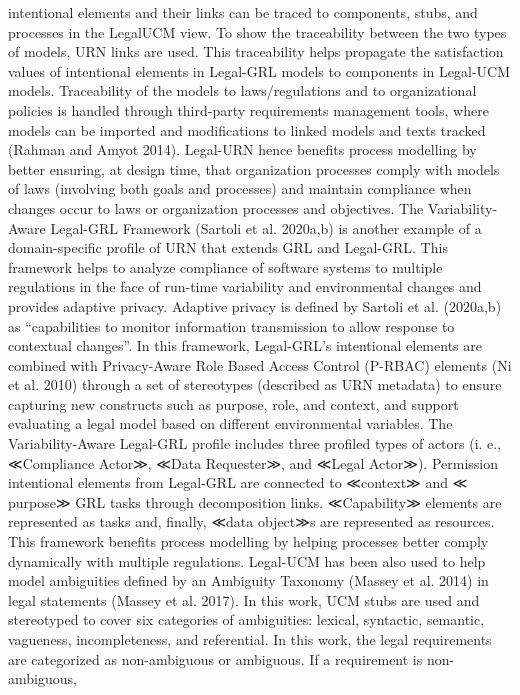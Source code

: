 intentional elements and their links can be traced
to components, stubs, and processes in the LegalUCM view. To show the traceability between the
two types of models, URN links are used. This
traceability helps propagate the satisfaction values
of intentional elements in Legal-GRL models to
components in Legal-UCM models. Traceability
of the models to laws/regulations and to organizational policies is handled through third-party
requirements management tools, where models
can be imported and modifications to linked models and texts tracked (Rahman and Amyot 2014).
Legal-URN hence benefits process modelling by
better ensuring, at design time, that organization
processes comply with models of laws (involving
both goals and processes) and maintain compliance when changes occur to laws or organization
processes and objectives.
The Variability-Aware Legal-GRL Framework
(Sartoli et al. 2020a,b) is another example of a
domain-specific profile of URN that extends GRL
and Legal-GRL. This framework helps to analyze
compliance of software systems to multiple regulations in the face of run-time variability and
environmental changes and provides adaptive privacy. Adaptive privacy is defined by Sartoli et
al. (2020a,b) as “capabilities to monitor information transmission to allow response to contextual
changes”. In this framework, Legal-GRL’s intentional elements are combined with Privacy-Aware
Role Based Access Control (P-RBAC) elements
(Ni et al. 2010) through a set of stereotypes (described as URN metadata) to ensure capturing new
constructs such as purpose, role, and context, and
support evaluating a legal model based on different
environmental variables. The Variability-Aware
Legal-GRL profile includes three profiled types
of actors (i. e., ≪Compliance Actor≫, ≪Data
Requester≫, and ≪Legal Actor≫). Permission
intentional elements from Legal-GRL are connected to ≪context≫ and ≪ purpose≫ GRL tasks
through decomposition links. ≪Capability≫ elements are represented as tasks and, finally, ≪data
object≫s are represented as resources. This framework benefits process modelling by helping processes better comply dynamically with multiple
regulations.
Legal-UCM has been also used to help model
ambiguities defined by an Ambiguity Taxonomy
(Massey et al. 2014) in legal statements (Massey et
al. 2017). In this work, UCM stubs are used and
stereotyped to cover six categories of ambiguities:
lexical, syntactic, semantic, vagueness, incompleteness, and referential. In this work, the legal
requirements are categorized as non-ambiguous
or ambiguous. If a requirement is non-ambiguous,
